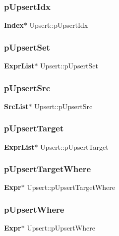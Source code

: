 \subsubsection{pUpsertIdx}
{\footnotesize\ttfamily \textbf{ Index}$\ast$ Upsert\+::p\+Upsert\+Idx}

\mbox{\label{struct_upsert_a67a83b82a792661bf71e166233371bf6}} 
\subsubsection{pUpsertSet}
{\footnotesize\ttfamily \textbf{ Expr\+List}$\ast$ Upsert\+::p\+Upsert\+Set}

\mbox{\label{struct_upsert_a85cde42e4ea925d0f7ec3bde6302d0d6}} 
\subsubsection{pUpsertSrc}
{\footnotesize\ttfamily \textbf{ Src\+List}$\ast$ Upsert\+::p\+Upsert\+Src}

\mbox{\label{struct_upsert_a502a6faab50ddbaa3be7c40560cc387c}} 
\subsubsection{pUpsertTarget}
{\footnotesize\ttfamily \textbf{ Expr\+List}$\ast$ Upsert\+::p\+Upsert\+Target}

\mbox{\label{struct_upsert_a5ed0e4530676e8e083a1367de0431ccf}} 
\subsubsection{pUpsertTargetWhere}
{\footnotesize\ttfamily \textbf{ Expr}$\ast$ Upsert\+::p\+Upsert\+Target\+Where}

\mbox{\label{struct_upsert_a961b481398a4c9ff4fe2de2b4c91de60}} 
\subsubsection{pUpsertWhere}
{\footnotesize\ttfamily \textbf{ Expr}$\ast$ Upsert\+::p\+Upsert\+Where}

